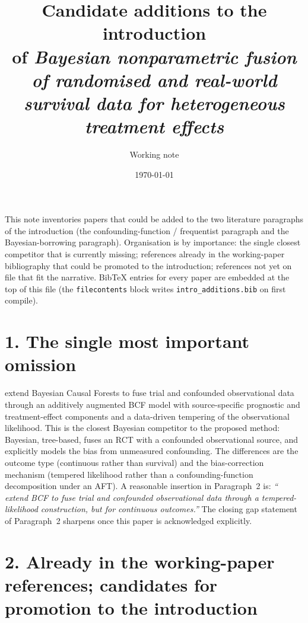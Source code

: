 \documentclass[11pt]{article}
\title{Candidate additions to the introduction\\of \emph{Bayesian nonparametric fusion of randomised and real-world survival data for heterogeneous treatment effects}}
\author{Working note}
\date{\today}
\begin{document}
\maketitle

\noindent
This note inventories papers that could be added to the two literature paragraphs of the introduction (the confounding-function / frequentist paragraph and the Bayesian-borrowing paragraph). Organisation is by importance: the single closest competitor that is currently missing; references already in the working-paper bibliography that could be promoted to the introduction; references not yet on file that fit the narrative. BibTeX entries for every paper are embedded at the top of this file (the \verb|filecontents| block writes \verb|intro_additions.bib| on first compile).

\section*{1. The single most important omission}

\citet{yozova2025data} extend Bayesian Causal Forests to fuse trial and confounded observational data through an additively augmented BCF model with source-specific prognostic and treatment-effect components and a data-driven tempering of the observational likelihood. This is the closest Bayesian competitor to the proposed method: Bayesian, tree-based, fuses an RCT with a confounded observational source, and explicitly models the bias from unmeasured confounding. The differences are the outcome type (continuous rather than survival) and the bias-correction mechanism (tempered likelihood rather than a confounding-function decomposition under an AFT). A reasonable insertion in Paragraph~2 is: \emph{``\citet{yozova2025data} extend BCF to fuse trial and confounded observational data through a tempered-likelihood construction, but for continuous outcomes.''} The closing gap statement of Paragraph~2 sharpens once this paper is acknowledged explicitly.

\section*{2. Already in the working-paper references; candidates for promotion to the introduction}
\end{document}
